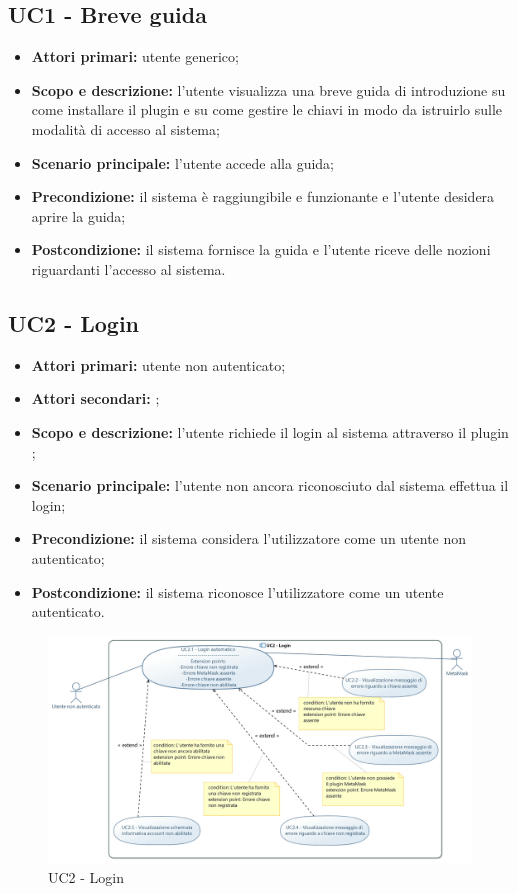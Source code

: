 \documentclass[AnalisiDeiRequisiti.tex]{subfiles}
\begin{document}
\subsection{UC1 - Breve guida}
\begin{itemize}
	\item \textbf{Attori primari:} utente generico;
	\item \textbf{Scopo e descrizione:} l'utente visualizza una breve guida di introduzione su come installare il plugin  e su come gestire le chiavi in modo da istruirlo sulle modalità di accesso al sistema;
	\item \textbf{Scenario principale:} l'utente accede alla guida;
	\item \textbf{Precondizione:} il sistema è raggiungibile e funzionante e l'utente desidera aprire la guida;
	\item \textbf{Postcondizione:} il sistema fornisce la guida e l'utente riceve delle nozioni riguardanti l'accesso al sistema.
\end{itemize}
\subsection{UC2 - Login}
\begin{itemize}
	\item \textbf{Attori primari:} utente non autenticato;
	\item \textbf{Attori secondari:} ;
	\item \textbf{Scopo e descrizione:} l'utente richiede il login al sistema attraverso il plugin ;
	\item \textbf{Scenario principale:} l'utente non ancora riconosciuto dal sistema effettua il login;
	\item \textbf{Precondizione:} il sistema considera l'utilizzatore come un utente non autenticato;
	\item \textbf{Postcondizione:} il sistema riconosce l'utilizzatore come un utente autenticato.\\
\end{itemize}

\begin{figure}[H]
	\centering
	\includegraphics[width=1.0\linewidth]{UC2.jpg}
	\caption{UC2 - Login}
	\label{fig:UC2 - Login}
\end{figure}
\end{document}
